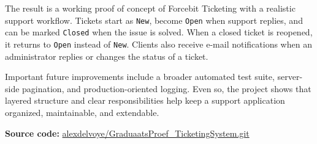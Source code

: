 {The result is a working proof of concept of Forcebit Ticketing with a realistic support workflow. Tickets start as \texttt{New}, become \texttt{Open} when support replies, and can be marked \texttt{Closed} when the issue is solved. When a closed ticket is reopened, it returns to \texttt{Open} instead of \texttt{New}. Clients also receive e-mail notifications when an administrator replies or changes the status of a ticket.

\smallskip

Important future improvements include a broader automated test suite, server-side pagination, and production-oriented logging. Even so, the project shows that layered structure and clear responsibilities help keep a support application organized, maintainable, and extendable.

\vfill

\noindent\textbf{Source code:} \href{https://github.com/alexdelvoye/GraduaatsProef_TicketingSystem.git}{alexdelvoye/GraduaatsProef\_TicketingSystem.git}

}{}



